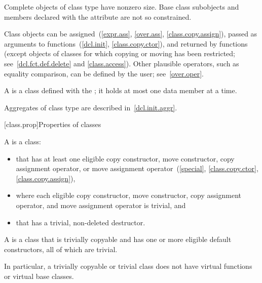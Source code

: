 \pnum
\begin{note}
Complete objects of class type have nonzero size.
Base class subobjects and
members declared with the  attribute
are not so constrained.
\end{note}

\pnum
\begin{note}
Class objects can be assigned~(\ref{expr.ass}, \ref{over.ass}, \ref{class.copy.assign}),
passed as arguments to functions~(\ref{dcl.init}, \ref{class.copy.ctor}), and
returned by functions (except objects of classes for which copying or moving has
been restricted; see~\ref{dcl.fct.def.delete} and \ref{class.access}).
Other plausible operators, such as equality comparison,
can be defined by the user; see~\ref{over.oper}.
\end{note}

\pnum
A  is a class defined with the 
;
it holds at most one data member at a time.
\begin{note}
Aggregates of class type are described in~\ref{dcl.init.aggr}.
\end{note}

[class.prop]{Properties of classes}

\pnum
A  is a class:
\begin{itemize}
\item that has at least one eligible
copy constructor, move constructor,
copy assignment operator, or
move assignment operator~(\ref{special}, \ref{class.copy.ctor}, \ref{class.copy.assign}),
\item where each eligible copy constructor, move constructor, copy assignment operator,
and move assignment operator is trivial, and
\item that has a trivial, non-deleted destructor.
\end{itemize}

\pnum
A  is a class that is trivially copyable and
has one or more eligible default constructors,
all of which are trivial.
\begin{note}
In particular, a trivially copyable or trivial class does not have
virtual functions or virtual base classes.
\end{note}

